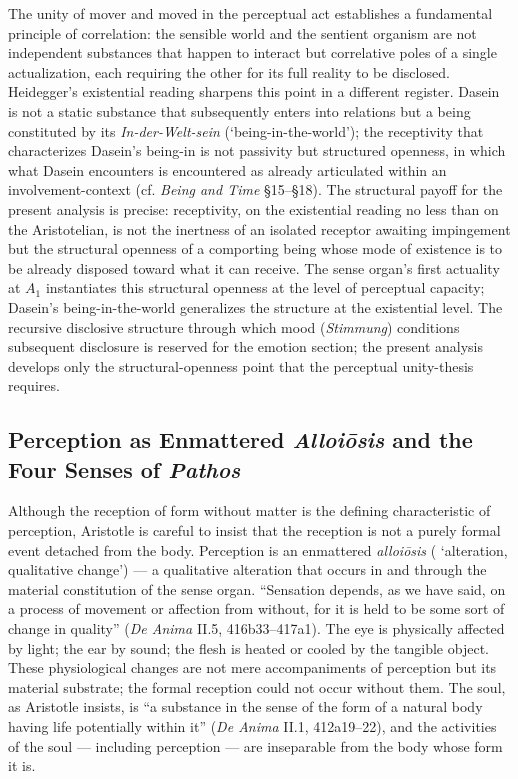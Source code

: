 The unity of mover and moved in the perceptual act establishes a fundamental principle of correlation: the sensible world and the sentient organism are not independent substances that happen to interact but correlative poles of a single actualization, each requiring the other for its full reality to be disclosed. Heidegger's existential reading sharpens this point in a different register. Dasein is not a static substance that subsequently enters into relations but a being constituted by its \textit{In-der-Welt-sein} (`being-in-the-world'); the receptivity that characterizes Dasein's being-in is not passivity but structured openness, in which what Dasein encounters is encountered as already articulated within an involvement-context (cf. \textit{Being and Time} \S 15--\S 18). The structural payoff for the present analysis is precise: receptivity, on the existential reading no less than on the Aristotelian, is not the inertness of an isolated receptor awaiting impingement but the structural openness of a comporting being whose mode of existence is to be already disposed toward what it can receive. The sense organ's first actuality at $A_1$ instantiates this structural openness at the level of perceptual capacity; Dasein's being-in-the-world generalizes the structure at the existential level. The recursive disclosive structure through which mood (\textit{Stimmung}) conditions subsequent disclosure is reserved for the emotion section; the present analysis develops only the structural-openness point that the perceptual unity-thesis requires.

\subsection{Perception as Enmattered \textit{Alloiōsis} and the Four Senses of \textit{Pathos}}

Although the reception of form without matter is the defining characteristic of perception, Aristotle is careful to insist that the reception is not a purely formal event detached from the body. Perception is an enmattered \textit{alloiōsis} ( `alteration, qualitative change') --- a qualitative alteration that occurs in and through the material constitution of the sense organ. ``Sensation depends, as we have said, on a process of movement or affection from without, for it is held to be some sort of change in quality'' (\textit{De Anima} II.5, 416b33--417a1). The eye is physically affected by light; the ear by sound; the flesh is heated or cooled by the tangible object. These physiological changes are not mere accompaniments of perception but its material substrate; the formal reception could not occur without them. The soul, as Aristotle insists, is ``a substance in the sense of the form of a natural body having life potentially within it'' (\textit{De Anima} II.1, 412a19--22), and the activities of the soul --- including perception --- are inseparable from the body whose form it is.


